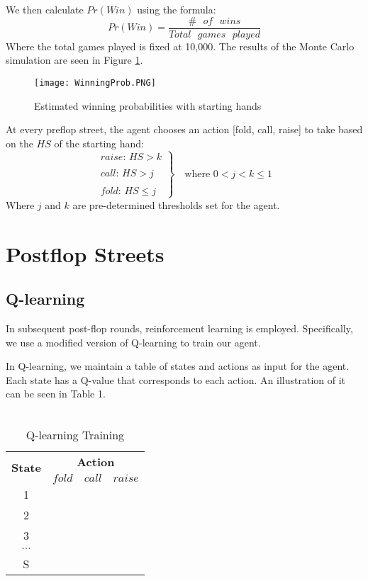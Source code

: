 \documentclass{article}
\begin{document}
We then calculate $Pr(Win)$ using the formula:
\begin{displaymath}
Pr(Win)= \frac{\# \text{ } of \text{ } wins}{Total \text{ }games \text{ } played}
\end{displaymath}
Where the total games played is fixed at 10,000. The results of the Monte Carlo simulation are seen in Figure \ref{fig:1}.
\begin{figure}
  \texttt{[image: WinningProb.PNG]}
  \caption{Estimated winning probabilities with starting hands}
  \label{fig:1}
\end{figure}

At every preflop street, the agent chooses an action [fold, call, raise] to take based on the $HS$ of the starting hand:
\begin{displaymath}
  \left.
  \begin{array}{l}
    raise \text{: } HS > k \\
    \\
    call \text{: } HS > j \\
    \\
    fold \text{: } HS \leq j
  \end{array}
  \right\rbrace \quad \text{where } 0 < j < k \leq 1
\end{displaymath}
Where $j$ and $k$ are pre-determined thresholds set for the agent.

\section{Postflop Streets}

\subsection{Q-learning}

In subsequent post-flop rounds, reinforcement learning is employed. Specifically, we use a modified version of Q-learning to train our agent.

In Q-learning, we maintain a table of states and actions as input for the agent. Each state has a Q-value that corresponds to each action. An illustration of it can be seen in Table 1. \\ \\

\begin{table}[h!]
  \begin{center}
	\begin{tabular}{ c|c|c|c }
	\hline
	\multirow{2}{*}{\textbf{State}}&\multicolumn{3}{|c}{\textbf{Action}}\\
	\cline{2-4}
	& $fold$ & $call$ & $raise$\\ 
	\hline
	1\\
	2\\ 
	3\\ 
	$\cdots$\\
	S\\
	\hline
	\end{tabular}
	\caption{Q-learning Training}
    \label{tab:table1}
  \end{center}
\end{table}
\end{document}
